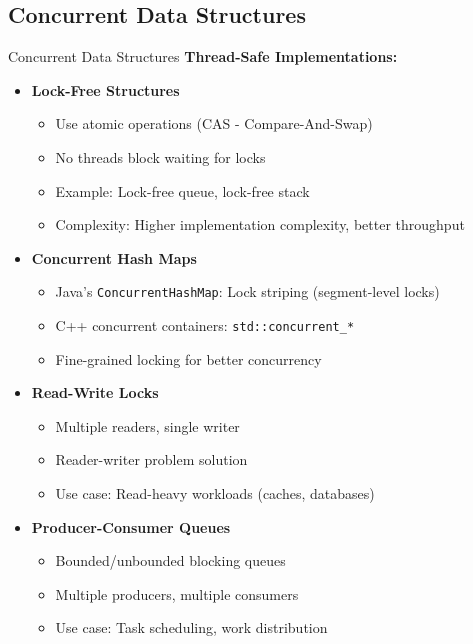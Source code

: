 \documentclass[aspectratio=169,xcolor=dvipsnames]{beamer}
\begin{document}
\subsection{Concurrent Data Structures}

\begin{frame}{Concurrent Data Structures}
  \textbf{Thread-Safe Implementations:}

  \vspace{0.3cm}
  \begin{itemize}
    \item \textbf{Lock-Free Structures}
    \begin{itemize}
      \item Use atomic operations (CAS - Compare-And-Swap)
      \item No threads block waiting for locks
      \item Example: Lock-free queue, lock-free stack
      \item Complexity: Higher implementation complexity, better throughput
    \end{itemize}

    \vspace{0.2cm}
    \item \textbf{Concurrent Hash Maps}
    \begin{itemize}
      \item Java's \texttt{ConcurrentHashMap}: Lock striping (segment-level locks)
      \item C++ concurrent containers: \texttt{std::concurrent\_*}
      \item Fine-grained locking for better concurrency
    \end{itemize}

    \vspace{0.2cm}
    \item \textbf{Read-Write Locks}
    \begin{itemize}
      \item Multiple readers, single writer
      \item Reader-writer problem solution
      \item Use case: Read-heavy workloads (caches, databases)
    \end{itemize}

    \vspace{0.2cm}
    \item \textbf{Producer-Consumer Queues}
    \begin{itemize}
      \item Bounded/unbounded blocking queues
      \item Multiple producers, multiple consumers
      \item Use case: Task scheduling, work distribution
    \end{itemize}
  \end{itemize}
\end{frame}
\end{document}
